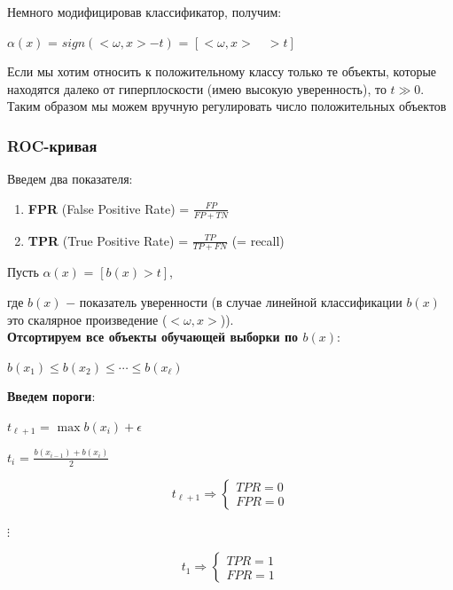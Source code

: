         Немного модифицировав классификатор, получим:
        \begin{center}
            $\alpha(x)$ = $sign (<\omega, x> - t)$ = $[<\omega, x> \quad > t]$
        \end{center}

        Если мы хотим относить к положительному классу только те объекты, которые находятся далеко от гиперплоскости (имею высокую уверенность), то $t \gg 0$. Таким образом мы можем вручную регулировать число положительных объектов 

        \subsubsection{ROC-кривая}
        Введем два показателя:
        \begin{enumerate}
            \item \textbf{FPR} (False Positive Rate) = $\frac{FP}{FP + TN}$
            \item \textbf{TPR} (True Positive Rate) = $\frac{TP}{TP + FN}$ (= recall)
        \end{enumerate}

        \begin{center}
            Пусть $\alpha(x)$ = $[b(x) > t]$,
        \end{center}
         где $b(x)$ $-$ показатель уверенности (в случае линейной классификации $b(x)$ это скалярное произведение ($<\omega, x>$)).\\
         \textbf{Отсортируем все объекты обучающей выборки по $b(x)$}:
         \begin{center}
             $b(x_1) \leq b(x_2) \leq \cdots \leq b(x_\ell)$
         \end{center}
         \textbf{Введем пороги}:
         \begin{center}
             $t_{\ell + 1}$ = $\max b(x_i) + \epsilon$
         \end{center}

         \begin{center}
             \large{$t_i$ = $\frac{b(x_{i-1}) + b(x_i)}{2}$}
         \end{center}


         \begin{equation*}
         t_{\ell + 1} \Longrightarrow
         \begin{cases}
           TPR = 0
           \\
           FPR = 0
         \end{cases}
        \end{equation*}
        \begin{center}
            $\vdots$
        \end{center}
        \begin{equation*}
         t_{1} \Longrightarrow
         \begin{cases}
           TPR = 1
           \\
           FPR = 1
         \end{cases}
        \end{equation*}

